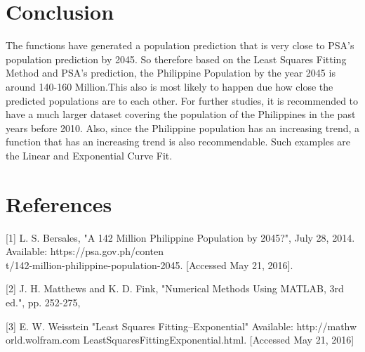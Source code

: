 \documentclass{acm_proc_article-sp}
\begin{document}
\section{Conclusion}
The functions have generated a population prediction that is very close to PSA's population prediction by 2045. So therefore based on the Least Squares Fitting Method and PSA's prediction, the Philippine Population by the year 2045 is around 140-160 Million.This also is most likely to happen due how close the predicted populations are to each other.  For further studies, it is recommended to have a much larger dataset covering the population of the Philippines in the past years before 2010. Also, since the Philippine population has an increasing trend, a function that has an increasing trend is also recommendable. Such examples are the Linear and Exponential Curve Fit. 

\section{References}
[1] L. S. Bersales, "A 142 Million Philippine Population by 2045?", July 28, 2014. Available: https://psa.gov.ph/conten\\t/142-million-philippine-population-2045. [Accessed May 21, 2016].

[2] J. H. Matthews and K. D. Fink, "Numerical Methods Using MATLAB, 3rd ed.", pp. 252-275, 

[3] E. W. Weisstein "Least Squares Fitting--Exponential" Available: http://mathw\\orld.wolfram.com LeastSquaresFittingExponential.html. [Accessed May 21, 2016]
\end{document}
